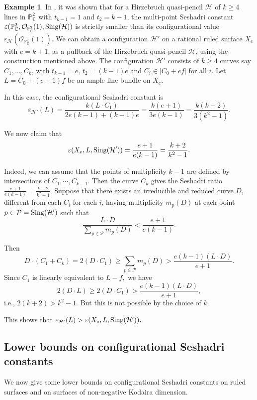 \documentclass[12pt,reqno]{amsart}
\theoremstyle{plain}
\numberwithin{equation}{section}
\theoremstyle{definition}
\newtheorem{example}[theorem]{Example}
\begin{document}
\begin{example}
In \cite[Example 3.1]{JP}, it was shown that for a Hirzebruch quasi-pencil $\mathcal{H}$ of $k\geq 4$ lines in $\mathbb{P}^2_{\mathbb{C}}$ with $t_{k-1}=1$ and $t_2=k-1$, the multi-point Seshadri constant $\varepsilon(\mathbb{P}^2_{\mathbb{C}}, \mathcal{O}_{\mathbb{P}^2_{\mathbb{C}}}(1),{\rm Sing}(\mathcal{H}))$ is strictly smaller than its configurational value $\varepsilon_{\mathcal{H}}(\mathcal{O}_{\mathbb{P}^2_{\mathbb{C}}}(1)).$ We can obtain a configuration $\mathcal{H}'$ on a rational ruled surface $X_e$ with $e=k+1$, as a pullback of the Hirzebruch quasi-pencil $\mathcal{H}$, using the construction mentioned above. The configuration $\mathcal{H}'$ consists of $k \geq 4$ curves say $C_{1}, \ldots, C_{k}$, with $t_{k-1}=e$, $t_2=(k-1)e$ and $ C_i \in |C_0+ef|$ for all $i.$ Let $L=C_0+(e+1)f$ be an ample line bundle on $X_e.$ 

In this case, the configurational Seshadri constant is 
	$$	\varepsilon_{\mathcal{H}'}(L)= \frac{k(L\cdot C_1)}{2e(k-1)+(k-1)e}= \frac{k(e+1)}{3e(k-1)}=\frac{k(k+2)}{3(k^2-1)}.$$

We now claim that 
	$$\varepsilon(X_e, L,{\rm Sing}(\mathcal{H}')) = \frac{e+1}{e(k-1)}=\frac{k+2}{k^2-1}.$$ 
	
	Indeed, we can assume that the points of multiplicity $k-1$ are defined by intersections of $C_1, \cdots, C_{k-1}$. Then the curve $C_k$ gives the Seshadri ratio $\frac{e+1}{e(k-1)}=\frac{k+2}{k^2-1}.$  Suppose that there exists an irreducible and reduced curve $D$, different from each $C_{i}$ for each $i$, having multiplicity $m_{p}(D)$ at each point $p \in \mathcal{P}={\rm Sing}(\mathcal{H}')$ such that
	\begin{equation*}
		\frac{L \cdot D}{\sum_{p \in \mathcal{P}} m_{p}(D)} < \frac{e+1}{e(k-1)}.		
\end{equation*}

Then 
$$D \cdot (C_1+C_k)=2 (D \cdot C_1) \geq \sum_{p \in \mathcal{P}} m_{p}(D) > \frac{e(k-1)(L \cdot D)}{e+1}.$$
Since $C_1$ is linearly equivalent to $L-f, $ we have $$2(D \cdot L) \geq 2(D \cdot C_{1})> \frac{e(k-1)(L \cdot D)}{e+1},$$ i.e., 
$2(k+2) > k^2-1.$ But this is not possible by the choice of $k$. 

	
	
	
	This shows that $\varepsilon_{\mathcal{H}'}(L) > \varepsilon(X_e, L,{\rm Sing}(\mathcal{H}')).$
\end{example}



\subsection{Lower bounds on configurational Seshadri constants}\label{bounds}
We now give some lower bounds on configurational Seshadri constants on ruled surfaces and on surfaces of non-negative Kodaira dimension.	
	
\end{document}
